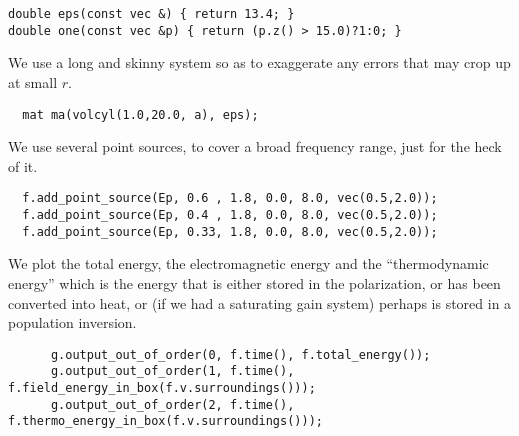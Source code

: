 \begin{verbatim}
double eps(const vec &) { return 13.4; }
double one(const vec &p) { return (p.z() > 15.0)?1:0; }
\end{verbatim}
\begin{comment}
int main(int argc, char **argv) {
  initialize mpi(argc, argv);
  deal_with_ctrl_c();
  const double ttot = 600.0;
\end{comment}
We use a long and skinny system so as to exaggerate any errors that may
crop up at small $r$.
\begin{verbatim}
  mat ma(volcyl(1.0,20.0, a), eps);
\end{verbatim}
\begin{comment}
  const char *dirname = make_output_directory(argv[0]);
  ma.set_output_directory(dirname);
  ma.add_polarizability(one, 0.25, 0.1, 3.0);
  fields f(&ma);
  grace g("energy", dirname);
\end{comment}
We use several point sources, to cover a broad frequency range, just for
the heck of it.
\begin{verbatim}
  f.add_point_source(Ep, 0.6 , 1.8, 0.0, 8.0, vec(0.5,2.0));
  f.add_point_source(Ep, 0.4 , 1.8, 0.0, 8.0, vec(0.5,2.0));
  f.add_point_source(Ep, 0.33, 1.8, 0.0, 8.0, vec(0.5,2.0));
\end{verbatim}
\begin{comment}
  double next_printtime = 50;
  while (f.time() < ttot && !interrupt) {
    if (f.time() >= next_printtime) {
      next_printtime += 50;
      master_printf("Working on time %
      master_printf("energy is %
\end{comment}
We plot the total energy, the electromagnetic energy and the
``thermodynamic energy'' which is the energy that is either stored in the
polarization, or has been converted into heat, or (if we had a saturating
gain system) perhaps is stored in a population inversion.
\begin{verbatim}
      g.output_out_of_order(0, f.time(), f.total_energy());
      g.output_out_of_order(1, f.time(), f.field_energy_in_box(f.v.surroundings()));
      g.output_out_of_order(2, f.time(), f.thermo_energy_in_box(f.v.surroundings()));
\end{verbatim}
\begin{comment}
    }
    f.step();
  }
}
\end{comment}

